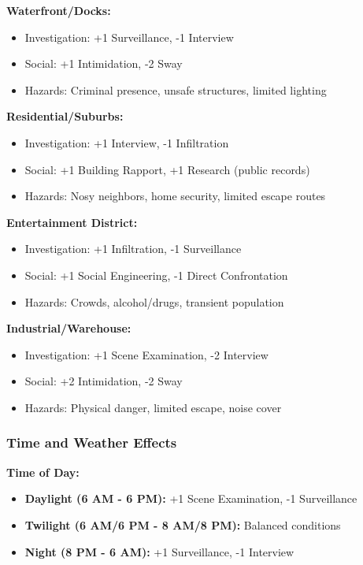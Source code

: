 \documentclass[11pt]{article}
\begin{document}
\textbf{Waterfront/Docks:}
\begin{itemize}
\item Investigation: +1 Surveillance, -1 Interview
\item Social: +1 Intimidation, -2 Sway
\item Hazards: Criminal presence, unsafe structures, limited lighting
\end{itemize}

\textbf{Residential/Suburbs:}
\begin{itemize}
\item Investigation: +1 Interview, -1 Infiltration
\item Social: +1 Building Rapport, +1 Research (public records)
\item Hazards: Nosy neighbors, home security, limited escape routes
\end{itemize}

\textbf{Entertainment District:}
\begin{itemize}
\item Investigation: +1 Infiltration, -1 Surveillance
\item Social: +1 Social Engineering, -1 Direct Confrontation
\item Hazards: Crowds, alcohol/drugs, transient population
\end{itemize}

\textbf{Industrial/Warehouse:}
\begin{itemize}
\item Investigation: +1 Scene Examination, -2 Interview
\item Social: +2 Intimidation, -2 Sway
\item Hazards: Physical danger, limited escape, noise cover
\end{itemize}

\subsubsection{Time and Weather Effects}

\textbf{Time of Day:}
\begin{itemize}
\item \textbf{Daylight (6 AM - 6 PM):} +1 Scene Examination, -1 Surveillance
\item \textbf{Twilight (6 AM/6 PM - 8 AM/8 PM):} Balanced conditions
\item \textbf{Night (8 PM - 6 AM):} +1 Surveillance, -1 Interview
\end{itemize}
\end{document}
